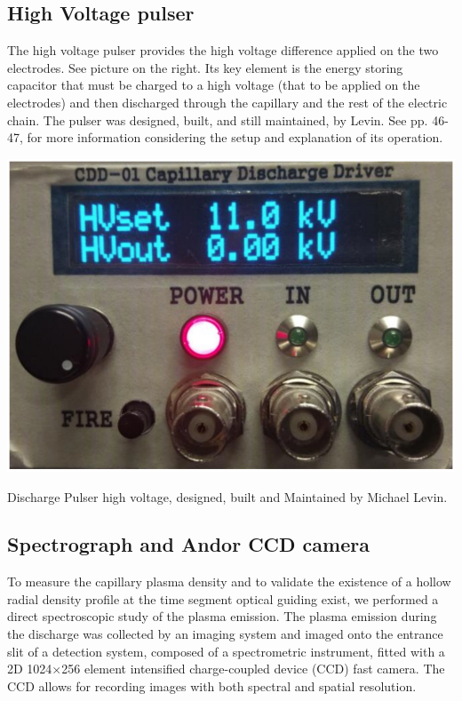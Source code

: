 \documentclass[justified,nofonts,nobib,openany]{tufte-book}
\begin{document}
\subsection{High Voltage pulser}
The high voltage pulser provides the high voltage difference applied on the two electrodes. See picture on the right. Its key element is the energy storing capacitor that must be charged to a high voltage (that to be applied on the electrodes) and then discharged through the capillary and the rest of the electric chain. The pulser was designed, built, and still maintained, by Levin. See  \cite{Levin2009ExcitationAcceleration} pp. 46-47, for more information considering the setup and explanation of its operation.
\begin{marginfigure}
\includegraphics[width=\marginparwidth]{figures/hvpulser.PNG}
\caption{Discharge Pulser high voltage, designed, built and Maintained by Michael Levin.}
\end{marginfigure}
	
\subsection{Spectrograph and Andor CCD camera}\label{ssec:spectro}
To measure the capillary plasma density and to validate the existence of a hollow radial density profile at the time segment optical guiding exist, we performed a direct spectroscopic study of the plasma emission. The plasma emission during the discharge was collected by an imaging system and imaged onto the entrance slit of a detection system, composed of a spectrometric instrument, fitted with a 2D 1024$\times$256 element intensified charge-coupled device (CCD) fast camera. The CCD allows for recording images with both spectral and spatial resolution.
\end{document}
